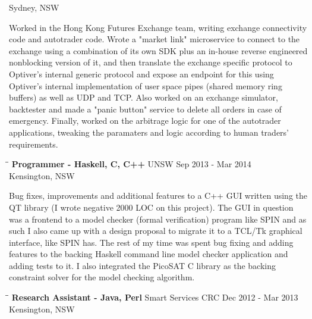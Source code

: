 \documentclass{res}
\begin{document}
\begin{resume}
\begin{tabbing}
                                   \>Sydney, NSW
   \end{tabbing}\vspace{-20pt}      %
    Worked in the Hong Kong Futures Exchange team, writing exchange connectivity
    code and autotrader code. Wrote a "market link" microservice to connect to
    the exchange using a combination of its own SDK plus an in-house reverse
    engineered nonblocking version of it, and then translate the exchange
    specific protocol to Optiver's internal generic protocol and expose an
    endpoint for this using Optiver's internal implementation of user space
    pipes (shared memory ring buffers) as well as UDP and TCP. Also worked on an
    exchange simulator, backtester and made a "panic button" service to delete
    all orders in case of emergency. Finally, worked on the arbitrage logic for
    one of the autotrader applications, tweaking the paramaters and logic
    according to human traders' requirements.
   \begin{tabbing}
   \hspace{2.3in}\= \hspace{2.6in}\= \kill %
    {\bf Programmer - Haskell, C, C++} \>UNSW \>Sep 2013 - Mar 2014\\
                                       \>Kensington, NSW
   \end{tabbing}\vspace{-20pt}      %
    Bug fixes, improvements and additional features to a C++ GUI written using
    the QT library (I wrote negative 2000 LOC on this project). The GUI in
    question was a frontend to a model checker (formal verification) program
    like SPIN and as such I also came up with a design proposal to migrate it
    to a TCL/Tk graphical interface, like SPIN has. The rest of my time was
    spent bug fixing and adding features to the backing Haskell command line
    model checker application and adding tests to it. I also integrated the
    PicoSAT C library as the backing constraint solver for the model checking
    algorithm.
   \begin{tabbing}
   \hspace{2.3in}\= \hspace{2.6in}\= \kill %
    {\bf Research Assistant - Java, Perl} \>Smart Services CRC \>Dec 2012 - Mar 2013\\
                                          \>Kensington, NSW
   \end{tabbing}\vspace{-20pt}      %

\end{resume}
\end{document}
